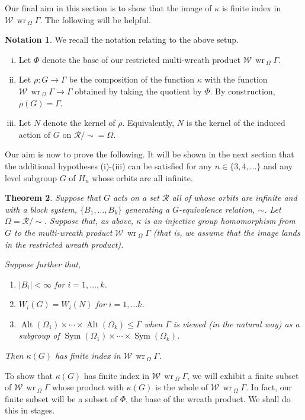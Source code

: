 \documentclass[11pt,a4paper]{amsart}
\newtheorem{theorem}{Theorem}[section]
\theoremstyle{definition}
\newtheorem{notation}[theorem]{Notation}
\theoremstyle{remark}
\newcommand{\Sym}{\operatorname{Sym}}
\newcommand{\Alt}{\operatorname{Alt}}
\newcommand{\Ra}{\mathcal{R}}
\newcommand{\base}{\Phi}
\renewcommand{\wr}{\operatorname{\,wr\,}}
\begin{document}
Our final aim in this section is to show that the image of $\kappa$ is finite index in $\mathcal{W}\wr_\Omega \Gamma$. The following will be helpful.
\begin{notation} \label{wreath notation} We recall the notation relating to the above setup.
\begin{enumerate}[(i)]
\item Let $\base$ denote the base of our restricted multi-wreath product $\mathcal{W}\wr_\Omega \Gamma$. 
\item Let $\rho: G \to \Gamma$ be the composition of the function $\kappa$ with the function $\mathcal{W}\wr_\Omega \Gamma\to \Gamma$ obtained by taking the quotient by $\base$. By construction, $\rho(G) = \Gamma$. 
\item Let $N$ denote the kernel of $\rho$. Equivalently, $N$ is the kernel of the induced action of $G$ on $\Ra/\sim = \Omega$. 
\end{enumerate}
\end{notation}
Our aim is now to prove the following. It will be shown in the next section that the additional hypotheses (i)-(iii) can be satisfied for any $n\in\{3, 4, \ldots\}$ and any level subgroup $G$ of $H_n$ whose orbits are all infinite.
\begin{theorem}\label{thm-kappaG} Suppose that $G$ acts on a set $\Ra$ all of whose orbits are infinite and with a block system, $\{ B_1, \ldots, B_k\}$ generating a $G$-equivalence relation, $\sim$. Let $\Omega= \Ra/\sim$. Suppose that, as above, $\kappa$ is an injective group homomorphism from $G$ to the multi-wreath product $\mathcal{W}\wr_\Omega \Gamma$ (that is, we assume that the image lands in the restricted wreath product). 

Suppose further that, 	
	\begin{enumerate}
		\item $|B_i|< \infty$ for $i=1, \ldots, k$.
		\item \label{induced perm} $W_i(G)=W_i(N)$ for $i=1, \ldots k$.
		\item $\Alt(\Omega_1)\times\cdots\times\Alt(\Omega_k)\le \Gamma$ when $\Gamma$ is viewed (in the natural way) as a subgroup of $\Sym(\Omega_1)\times\cdots\times\Sym(\Omega_k)$.
	\end{enumerate}
	
	
Then $\kappa(G)$ has finite index in $\mathcal{W}\wr_\Omega \Gamma$.

\end{theorem}


To show that $\kappa(G)$ has finite index in $\mathcal{W}\wr_\Omega \Gamma$, we will exhibit a finite subset of $\mathcal{W}\wr_\Omega \Gamma$ whose product with $\kappa(G)$ is the whole of $\mathcal{W}\wr_\Omega \Gamma$. In fact, our finite subset will be a subset of $\Phi$, the base of the wreath product. We shall do this in stages.  
\end{document}
